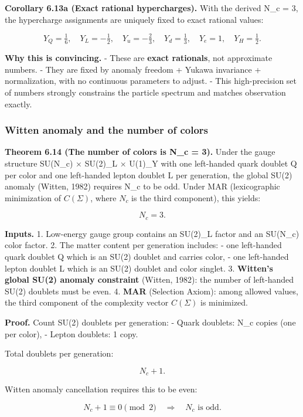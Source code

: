 \documentclass[11pt,a4paper]{article}
\theoremstyle{remark}
\begin{document}
\textbf{Corollary 6.13a (Exact rational hypercharges).} With the derived N\_c = 3,
the hypercharge assignments are uniquely fixed to exact rational values:

\[
Y_Q = \tfrac{1}{6}, \quad
Y_L = -\tfrac{1}{2}, \quad
Y_u = -\tfrac{2}{3}, \quad
Y_d = \tfrac{1}{3}, \quad
Y_e = 1, \quad
Y_H = \tfrac{1}{2}.
\]

\textbf{Why this is convincing.}
- These are \textbf{exact rationals}, not approximate numbers.
- They are fixed by anomaly freedom + Yukawa invariance + normalization,
with no continuous parameters to adjust.
- This high-precision set of numbers strongly constrains the particle
spectrum and matches observation exactly.

\subsubsection{Witten anomaly and the number of colors}\label{witten-anomaly-and-the-number-of-colors}

\textbf{Theorem 6.14 (The number of colors is N\_c = 3).}
Under the gauge structure SU(N\_c) \ensuremath{\times} SU(2)\_L \ensuremath{\times} U(1)\_Y with one
left-handed quark doublet Q per color and one left-handed lepton doublet
L per generation, the global SU(2) anomaly (Witten, 1982) requires
N\_c to be odd. Under MAR (lexicographic minimization of \(C(\Sigma)\),
where \(N_c\) is the third component), this yields:

\[
N_c = 3.
\]

\textbf{Inputs.}
1. Low-energy gauge group contains an SU(2)\_L factor and an SU(N\_c)
color factor.
2. The matter content per generation includes:
- one left-handed quark doublet Q which is an SU(2) doublet and
carries color,
- one left-handed lepton doublet L which is an SU(2) doublet and
color singlet.
3. \textbf{Witten's global SU(2) anomaly constraint} (Witten, 1982): the
number of left-handed SU(2) doublets must be even.
4. \textbf{MAR} (Selection Axiom): among allowed values, the third component
of the complexity vector \(C(\Sigma)\) is minimized.

\textbf{Proof.} Count SU(2) doublets per generation:
- Quark doublets: N\_c copies (one per color),
- Lepton doublets: 1 copy.

Total doublets per generation:

\[
N_c + 1.
\]

Witten anomaly cancellation requires this to be even:

\[
N_c + 1 \equiv 0 \pmod{2} \quad \Rightarrow \quad N_c \text{ is odd}.
\]
\end{document}
